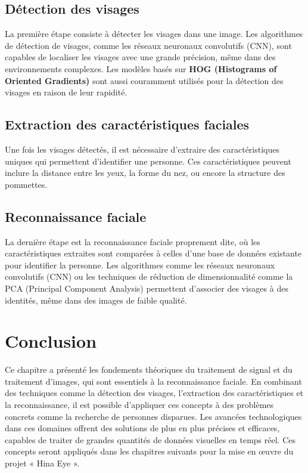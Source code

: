 \documentclass[a4paper,12pt]{report}
\begin{document}
\subsection{Détection des visages}
La première étape consiste à détecter les visages dans une image. Les algorithmes de détection de visages, comme les réseaux neuronaux convolutifs (CNN), sont capables de localiser les visages avec une grande précision, même dans des environnements complexes. Les modèles basés sur \textbf{HOG (Histograms of Oriented Gradients)} sont aussi couramment utilisés pour la détection des visages en raison de leur rapidité.

\subsection{Extraction des caractéristiques faciales}
Une fois les visages détectés, il est nécessaire d'extraire des caractéristiques uniques qui permettent d’identifier une personne. Ces caractéristiques peuvent inclure la distance entre les yeux, la forme du nez, ou encore la structure des pommettes.

\subsection{Reconnaissance faciale}
La dernière étape est la reconnaissance faciale proprement dite, où les caractéristiques extraites sont comparées à celles d’une base de données existante pour identifier la personne. Les algorithmes comme les réseaux neuronaux convolutifs (CNN) ou les techniques de réduction de dimensionnalité comme la PCA (Principal Component Analysis) permettent d’associer des visages à des identités, même dans des images de faible qualité.

\newpage

\section{Conclusion}
Ce chapitre a présenté les fondements théoriques du traitement de signal et du traitement d'images, qui sont essentiels à la reconnaissance faciale. En combinant des techniques comme la détection des visages, l'extraction des caractéristiques et la reconnaissance, il est possible d'appliquer ces concepts à des problèmes concrets comme la recherche de personnes disparues. Les avancées technologiques dans ces domaines offrent des solutions de plus en plus précises et efficaces, capables de traiter de grandes quantités de données visuelles en temps réel. Ces concepts seront appliqués dans les chapitres suivants pour la mise en œuvre du projet « Hina Eye ».
\end{document}
